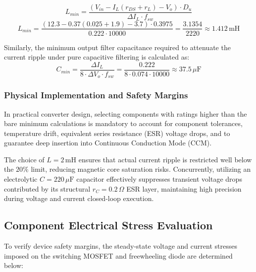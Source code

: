 \begin{equation}
L_{min} = \frac{\left(V_{in} - I_L(r_{DS} + r_L) - V_o\right) \cdot D_u}{\Delta I_L \cdot f_{sw}}
\end{equation}
\begin{equation}
L_{min} = \frac{\left(12.3 - 0.37(0.025 + 1.9) - 3.7\right) \cdot 0.3975}{0.222 \cdot 10000} = \frac{3.1354}{2220} \approx 1.412\,\text{mH}
\end{equation}

Similarly, the minimum output filter capacitance required to attenuate the current ripple under pure capacitive filtering is calculated as:
\begin{equation}
C_{min} = \frac{\Delta I_L}{8 \cdot \Delta V_o \cdot f_{sw}} = \frac{0.222}{8 \cdot 0.074 \cdot 10000} \approx 37.5\,\mu\text{F}
\end{equation}

\subsubsection{Physical Implementation and Safety Margins}
In practical converter design, selecting components with ratings higher than the bare minimum calculations is mandatory to account for component tolerances, temperature drift, equivalent series resistance (ESR) voltage drops, and to guarantee deep insertion into Continuous Conduction Mode (CCM). 

The choice of $L = 2\,\text{mH}$ ensures that actual current ripple is restricted well below the $20\%$ limit, reducing magnetic core saturation risks. Concurrently, utilizing an electrolytic $C = 220\,\mu\text{F}$ capacitor effectively suppresses transient voltage drops contributed by its structural $r_C = 0.2\,\Omega$ ESR layer, maintaining high precision during voltage and current closed-loop execution.

\subsection{Component Electrical Stress Evaluation}
To verify device safety margins, the steady-state voltage and current stresses imposed on the switching MOSFET and freewheeling diode are determined below:

